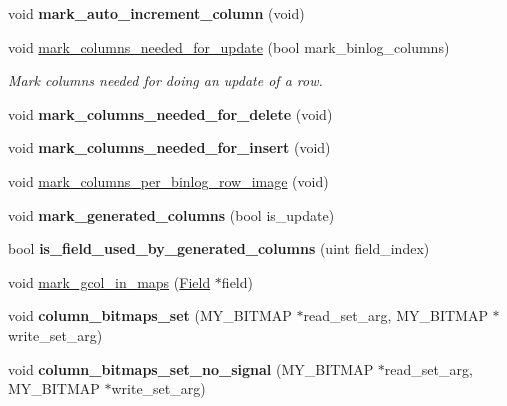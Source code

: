 \begin{DoxyCompactItemize}
\mbox{\label{structTABLE_a670d7c4738958709183cf92e537fda90}} 
void {\bfseries mark\+\_\+auto\+\_\+increment\+\_\+column} (void)
\item 
void \mbox{\hyperlink{structTABLE_a1976cb0e08aae6b4d4b304038dc8cc03}{mark\+\_\+columns\+\_\+needed\+\_\+for\+\_\+update}} (bool mark\+\_\+binlog\+\_\+columns)
\begin{DoxyCompactList}\small\item\em Mark columns needed for doing an update of a row. \end{DoxyCompactList}\item 
\mbox{\label{structTABLE_a747f849a680a18deccc998dc994c813c}} 
void {\bfseries mark\+\_\+columns\+\_\+needed\+\_\+for\+\_\+delete} (void)
\item 
\mbox{\label{structTABLE_af89aa9b00b3aedab92faadb36915a8b8}} 
void {\bfseries mark\+\_\+columns\+\_\+needed\+\_\+for\+\_\+insert} (void)
\item 
void \mbox{\hyperlink{structTABLE_a80aa5acb1308e30d425ab0c9b07fa809}{mark\+\_\+columns\+\_\+per\+\_\+binlog\+\_\+row\+\_\+image}} (void)
\item 
\mbox{\label{structTABLE_a01663f182cd533bfa9f3afeb95a445cc}} 
void {\bfseries mark\+\_\+generated\+\_\+columns} (bool is\+\_\+update)
\item 
\mbox{\label{structTABLE_ac10d3a702c37c164217ad53c32bb442a}} 
bool {\bfseries is\+\_\+field\+\_\+used\+\_\+by\+\_\+generated\+\_\+columns} (uint field\+\_\+index)
\item 
void \mbox{\hyperlink{structTABLE_a018e1c973c05f94e62c753e80559c1c1}{mark\+\_\+gcol\+\_\+in\+\_\+maps}} (\mbox{\hyperlink{classField}{Field}} $\ast$field)
\item 
\mbox{\label{structTABLE_aa84efd6d51982ece61e97da8d9e22854}} 
void {\bfseries column\+\_\+bitmaps\+\_\+set} (M\+Y\+\_\+\+B\+I\+T\+M\+AP $\ast$read\+\_\+set\+\_\+arg, M\+Y\+\_\+\+B\+I\+T\+M\+AP $\ast$write\+\_\+set\+\_\+arg)
\item 
\mbox{\label{structTABLE_a061044c0def9e1598b6edb9b2f224390}} 
void {\bfseries column\+\_\+bitmaps\+\_\+set\+\_\+no\+\_\+signal} (M\+Y\+\_\+\+B\+I\+T\+M\+AP $\ast$read\+\_\+set\+\_\+arg, M\+Y\+\_\+\+B\+I\+T\+M\+AP $\ast$write\+\_\+set\+\_\+arg)

\end{DoxyCompactItemize}
